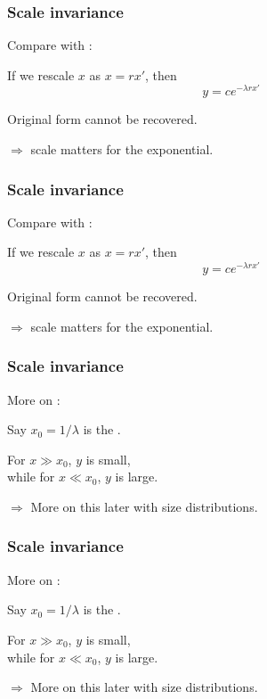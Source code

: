 \begin{frame}
  \frametitle{Scale invariance}

Compare with :

If we rescale $x$ as $x = rx'$, then
$$ y = c e^{-\lambda rx'} $$

Original form cannot be recovered.

\inv

$\Rightarrow$ scale matters for the exponential.

\end{frame}

\begin{frame}
  \frametitle{Scale invariance}

Compare with :

If we rescale $x$ as $x = rx'$, then
$$ y = c e^{-\lambda rx'} $$

Original form cannot be recovered.

$\Rightarrow$ scale matters for the exponential.

\end{frame}

\begin{frame}
  \frametitle{Scale invariance}

More on :

\inv

Say $x_0 = 1/\lambda$ is the .

For $x \gg x_0$, $y$ is small,\\
while for $x \ll x_0$, $y$ is large.

$\Rightarrow$ More on this later with size distributions.

\end{frame}

\begin{frame}
  \frametitle{Scale invariance}

More on :

Say $x_0 = 1/\lambda$ is the .

\inv 

For $x \gg x_0$, $y$ is small,\\
while for $x \ll x_0$, $y$ is large.

$\Rightarrow$ More on this later with size distributions.

\end{frame}

